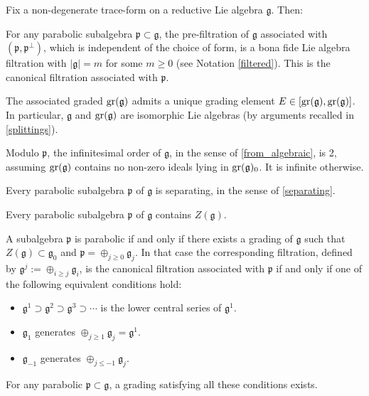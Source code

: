 \documentclass[leqno,12pt]{amsart} %
\begin{document}
\begin{proposition}
  Fix a non-degenerate trace-form on a reductive Lie algebra ${\mathfrak g}$. Then:
  \begin{conditions}
  \item\label{qq1} For any parabolic subalgebra ${\mathfrak p} \subset {\mathfrak g} $,
    the pre-filtration of ${\mathfrak g} $ associated with
    $({\mathfrak p},{\mathfrak p}^\perp) $, which is independent of the choice of form, is
    a bona fide Lie algebra filtration with $|{\mathfrak g}| = m $ for some $m\ge 0$ (see Notation
    \ref{filtered}). This is the {\df canonical filtration} associated with
    ${\mathfrak p}$.
  \item\label{qq1b} The associated graded $\operatorname{\operatorname{gr}}({\mathfrak g})$ admits a unique grading
    element $E \in [\operatorname{\operatorname{gr}}({\mathfrak g}), \operatorname{\operatorname{gr}}({\mathfrak g})]$. In particular,
    ${\mathfrak g} $ and $\operatorname{\operatorname{gr}}({\mathfrak g}) $ are isomorphic Lie algebras (by
    arguments recalled in \ref{splittings}).
  \item Modulo ${\mathfrak p} $, the infinitesimal order of ${\mathfrak g} $, in the sense
    of \ref{from_algebraic}, is 2, assuming $\operatorname{\operatorname{gr}}({\mathfrak g})$ contains no
    non-zero ideals lying in $\operatorname{\operatorname{gr}}({\mathfrak g})_0$. It is infinite otherwise.
  \item \label{cando} Every parabolic subalgebra ${\mathfrak p} $ of ${\mathfrak g}$ is
    separating, in the sense of \ref{separating}.
  \item \label{candoz} Every parabolic subalgebra ${\mathfrak p} $ of ${\mathfrak g}$
    contains $Z({\mathfrak g})$.
  \item\label{qq4} A subalgebra ${\mathfrak p} $ is parabolic if and only if there exists
    a grading of ${\mathfrak g} $ such that $Z({\mathfrak g}) \subset {\mathfrak g}_0$ and
    ${\mathfrak p} = \oplus_{j\ge 0} {\mathfrak g}_j$. In that case the corresponding
    filtration, defined by ${\mathfrak g}^j:=\oplus_{i\ge j}{\mathfrak g}_i$, is the
    canonical filtration associated with ${\mathfrak p} $ if and only if one of the
    following equivalent conditions hold:
    \begin{itemize}
    \item
      ${\mathfrak g}^1 \supset {\mathfrak g}^2 \supset {\mathfrak g}^3 \supset \cdots $ is
      the lower central series of ${\mathfrak g}^1$.
    \item ${\mathfrak g}_1$ generates
     $\oplus_{j\ge 1}{\mathfrak g}_j={\mathfrak g}^1$.
    \item  ${\mathfrak g}_{-1}$ generates $\oplus_{j\le -1}{\mathfrak g}_j$.
    \end{itemize}
    For any parabolic ${\mathfrak p} \subset {\mathfrak g} $, a grading satisfying all
    these conditions exists.
  \end{conditions}
\end{proposition}
\end{document}
